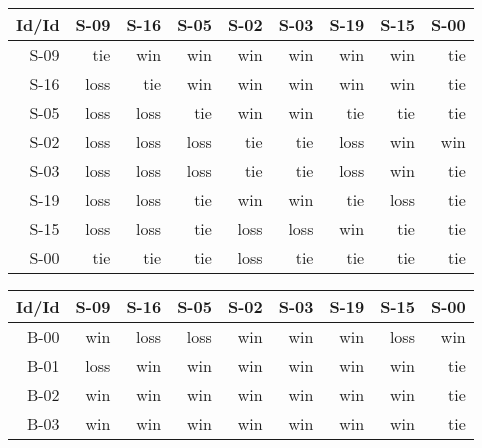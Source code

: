 \begin{tabular}{ | r | r | r | r | r | r | r | r | r | }
    \hline
        Id/Id  &   S-09  &   S-16  &   S-05  &   S-02  &   S-03  &   S-19  &   S-15  &   S-00  \\
    \hline
    \hline
         S-09  &    tie  &    win  &    win  &    win  &    win  &    win  &    win  &    tie  \\
    \hline
         S-16  &   loss  &    tie  &    win  &    win  &    win  &    win  &    win  &    tie  \\
    \hline
         S-05  &   loss  &   loss  &    tie  &    win  &    win  &    tie  &    tie  &    tie  \\
    \hline
         S-02  &   loss  &   loss  &   loss  &    tie  &    tie  &   loss  &    win  &    win  \\
    \hline
         S-03  &   loss  &   loss  &   loss  &    tie  &    tie  &   loss  &    win  &    tie  \\
    \hline
         S-19  &   loss  &   loss  &    tie  &    win  &    win  &    tie  &   loss  &    tie  \\
    \hline
         S-15  &   loss  &   loss  &    tie  &   loss  &   loss  &    win  &    tie  &    tie  \\
    \hline
         S-00  &    tie  &    tie  &    tie  &   loss  &    tie  &    tie  &    tie  &    tie  \\
    \hline
\end{tabular}


\begin{tabular}{ | r | r | r | r | r | r | r | r | r | }
    \hline
        Id/Id  &   S-09  &   S-16  &   S-05  &   S-02  &   S-03  &   S-19  &   S-15  &   S-00  \\
    \hline
    \hline
         B-00  &    win  &   loss  &   loss  &    win  &    win  &    win  &   loss  &    win  \\
    \hline
         B-01  &   loss  &    win  &    win  &    win  &    win  &    win  &    win  &    tie  \\
    \hline
         B-02  &    win  &    win  &    win  &    win  &    win  &    win  &    win  &    tie  \\
    \hline
         B-03  &    win  &    win  &    win  &    win  &    win  &    win  &    win  &    tie  \\
    \hline
\end{tabular}




